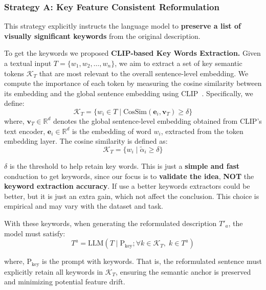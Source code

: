 \subsubsection{Strategy A: Key Feature Consistent Reformulation} 

\hfill \break
This strategy explicitly instructs the language model to \textbf{preserve a list of visually significant keywords} from the original description. 

To get the keywords we proposed \textbf{CLIP-based Key Words Extraction.}
Given a textual input \( T = \{w_1, w_2, \dots, w_n\} \), we aim to extract a set of key semantic tokens \(\mathcal{K}_T\) that are most relevant to the overall sentence-level embedding. We compute the importance of each token by measuring the cosine similarity between its embedding and the global sentence embedding using CLIP~\cite{radford2021learning}. Specifically, we define:
\begin{equation}
\mathcal{K}_T = \{ w_i \in T \mid \text{CosSim}(\mathbf{e}_i, \mathbf{v}_T) \geq \delta \}
\end{equation}
where, \(\mathbf{v}_T \in \mathbb{R}^d\) denotes the global sentence-level embedding obtained from CLIP's text encoder, \(\mathbf{e}_i \in \mathbb{R}^d\) is the embedding of word \(w_i\), extracted from the token embedding layer. The cosine similarity is defined as:
\begin{equation}
\mathcal{K}_T = \{ w_i \mid \tilde{\alpha}_i \geq \delta \}
\end{equation}

$\delta$ is the threshold to help retain key words. This is just a \textbf{simple and fast} conduction to get keywords, since our focus is to \textbf{validate the idea}, \textbf{NOT} the \textbf{keyword extraction accuracy}. If use a better keywords extractors could be better, but it is just an extra gain, which not affect the conclusion. This choice is empirical and may vary with the dataset and task.

With these keywords, when generating the reformulated description \( T'_a \), the model must satisfy:
\begin{equation}
T^a = \text{LLM}(T \mid \text{P}_{\text{key}}; \forall k \in \mathcal{K}_T, \; k \in T^a)  
\end{equation}

where, $\text{P}_{\text{key}}$ is the prompt with keywords. That is, the reformulated sentence must explicitly retain all keywords in \( \mathcal{K}_T \), ensuring the semantic anchor is preserved and minimizing potential feature drift.


